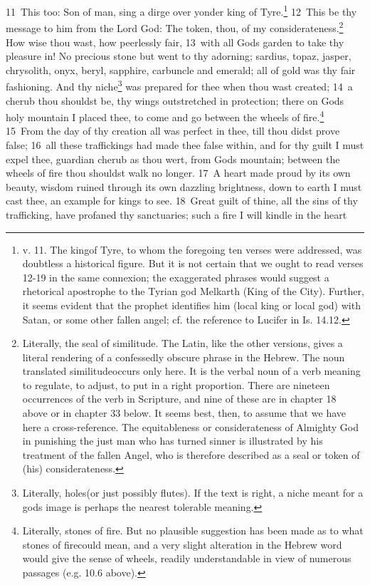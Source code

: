 \documentclass[10pt]{book} %
\begin{document}
\textcolor{benred8}{11}~This too: Son of man, sing a dirge over yonder king of Tyre.\footnote[1]{v. 11. The \textasciigrave king\textquotesingle  of Tyre, to whom the foregoing ten verses were addressed, was doubtless a historical figure. But it is not certain that we ought to read verses 12-19 in the same connexion; the exaggerated phrases would suggest a rhetorical apostrophe to the Tyrian god Melkarth (\textasciigrave King of the City\textquotesingle ). Further, it seems evident that the prophet identifies him (local king or local god) with Satan, or some other fallen angel; cf. the reference to Lucifer in Is. 14.12.} \textcolor{benred8}{12}~This be thy message to him from the Lord God: The token, thou, of my considerateness.\footnote[2]{Literally, \textasciigrave the seal of similitude\textquotesingle . The Latin, like the other versions, gives a literal rendering of a confessedly obscure phrase in the Hebrew. The noun translated \textasciigrave similitude\textquotesingle  occurs only here. It is the verbal noun of a verb meaning to regulate, to adjust, to put in a right proportion. There are nineteen occurrences of the verb in Scripture, and nine of these are in chapter 18 above or in chapter 33 below. It seems best, then, to assume that we have here a cross-reference. The equitableness or considerateness of Almighty God in punishing the just man who has turned sinner is illustrated by his treatment of the fallen Angel, who is therefore described as a seal or token of (his) considerateness.} How wise thou wast, how peerlessly fair, \textcolor{benred8}{13}~with all God\textquotesingle s garden to take thy pleasure in! No precious stone but went to thy adorning; sardius, topaz, jasper, chrysolith, onyx, beryl, sapphire, carbuncle and emerald; all of gold was thy fair fashioning. And thy niche\footnote[3]{Literally, \textasciigrave holes\textquotesingle  (or just possibly \textasciigrave flutes\textquotesingle ). If the text is right, a niche meant for a god\textquotesingle s image is perhaps the nearest tolerable meaning.} was prepared for thee when thou wast created; \textcolor{benred8}{14}~a cherub thou shouldst be, thy wings outstretched in protection; there on God\textquotesingle s holy mountain I placed thee, to come and go between the wheels of fire.\footnote[4]{Literally, \textasciigrave stones of fire\textquotesingle . But no plausible suggestion has been made as to what \textasciigrave stones of fire\textquotesingle  could mean, and a very slight alteration in the Hebrew word would give the sense of \textasciigrave wheels\textquotesingle , readily understandable in view of numerous passages (e.g. 10.6 above).} \textcolor{benred8}{15}~From the day of thy creation all was perfect in thee, till thou didst prove false; \textcolor{benred8}{16}~all these traffickings had made thee false within, and for thy guilt I must expel thee, guardian cherub as thou wert, from God\textquotesingle s mountain; between the wheels of fire thou shouldst walk no longer. \textcolor{benred8}{17}~A heart made proud by its own beauty, wisdom ruined through its own dazzling brightness, down to earth I must cast thee, an example for kings to see. \textcolor{benred8}{18}~Great guilt of thine, all the sins of thy trafficking, have profaned thy sanctuaries; such a fire I will kindle in the heart 
\end{document}
